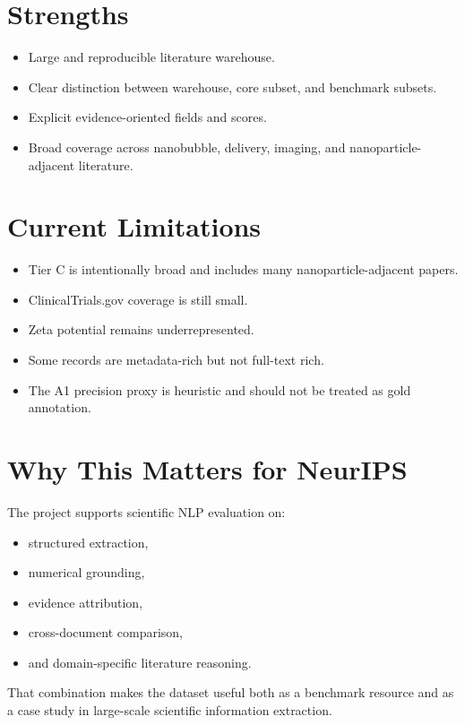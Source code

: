 \documentclass[11pt]{article}
\begin{document}
\section*{Strengths}
\begin{itemize}[leftmargin=1.7em]
    \item Large and reproducible literature warehouse.
    \item Clear distinction between warehouse, core subset, and benchmark subsets.
    \item Explicit evidence-oriented fields and scores.
    \item Broad coverage across nanobubble, delivery, imaging, and nanoparticle-adjacent literature.
\end{itemize}

\section*{Current Limitations}
\begin{itemize}[leftmargin=1.7em]
    \item Tier C is intentionally broad and includes many nanoparticle-adjacent papers.
    \item ClinicalTrials.gov coverage is still small.
    \item Zeta potential remains underrepresented.
    \item Some records are metadata-rich but not full-text rich.
    \item The A1 precision proxy is heuristic and should not be treated as gold annotation.
\end{itemize}

\section*{Why This Matters for NeurIPS}
The project supports scientific NLP evaluation on:
\begin{itemize}[leftmargin=1.7em]
    \item structured extraction,
    \item numerical grounding,
    \item evidence attribution,
    \item cross-document comparison,
    \item and domain-specific literature reasoning.
\end{itemize}
That combination makes the dataset useful both as a benchmark resource and as a case study in large-scale scientific information extraction.
\end{document}

